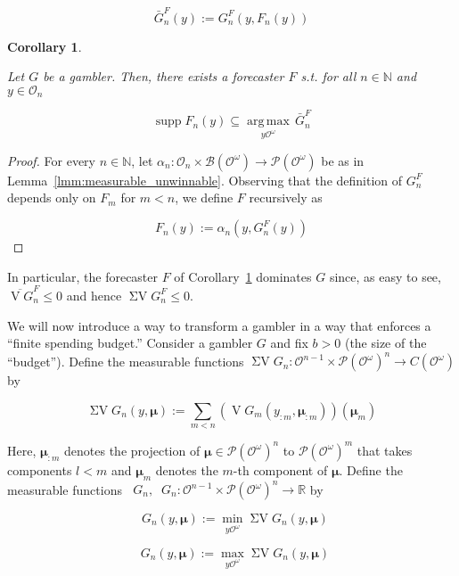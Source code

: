 \documentclass[11pt]{article}
\theoremstyle{definition}
\theoremstyle{plain}
\newtheorem{corollary}{Corollary}%
\newcommand{\Nats}{\mathbb{N}}
\newcommand{\Reals}{\mathbb{R}}
\newcommand{\Argmax}[1]{\underset{#1}{\operatorname{arg\,max}}\,}
\newcommand{\PM}{\mathcal{P}}
\DeclareMathOperator{\Sp}{supp}
\newcommand{\Ob}{\mathcal{O}}
\newcommand{\OO}{\Ob^\omega}
\newcommand{\PMO}{\PM(\OO)}
\newcommand{\Gm}{\mathcal{B}}
\newcommand{\GMO}{\Gm(\OO)}
\newcommand{\CO}{C(\OO)}
\DeclareMathOperator{\V}{V}
\DeclareMathOperator{\SV}{\Sigma V}
\DeclareMathOperator{\SVM}{\Sigma V_{\min}}
\DeclareMathOperator{\SVX}{\Sigma V_{\max}}
\newcommand{\BM}{\bm{\mu}}
\begin{document}
\begin{equation}
\bar{G}^F_n(y) := G^F_n(y,F_n(y))
\end{equation}

\begin{corollary}
\label{crl:dominate_one}

Let $G$ be a gambler. Then, there exists a forecaster $F$ s.t. for all $n \in \Nats$ and $y \in \Ob_n$

\begin{equation}
\Sp F_n(y) \subseteq \Argmax{y\OO} \bar{G}^F_n
\end{equation}

\end{corollary}

\begin{proof}

For every $n \in \Nats$, let $\alpha_n: \Ob_n \times \GMO \rightarrow \PMO$ be as in Lemma~\ref{lmm:measurable_unwinnable}. Observing that the definition of $G^F_n$ depends only on $F_m$ for $m < n$, we define $F$ recursively as

\[F_n(y):=\alpha_n(y,G^F_n(y))\]
\end{proof}

In particular, the forecaster $F$ of Corollary~\ref{crl:dominate_one} dominates $G$ since, as easy to see, $\overline{\V G}^F_n \leq 0$ and hence $\SV G^F_n \leq 0$.

We will now introduce a way to transform a gambler in a way that enforces a \enquote{finite spending budget.} Consider a gambler $G$ and fix $b > 0$ (the size of the \enquote{budget}). Define the measurable functions $\SV G_n: \Ob^{n-1} \times \PMO^n  \rightarrow \CO$ by

\begin{equation}
\SV G_n(y,\BM) := \sum_{m < n} (\V G_m(y_{:m},\BM_{:m}))(\BM_m)
\end{equation}

Here, $\BM_{:m}$ denotes the projection of $\BM \in \PMO^n$ to $\PMO^m$ that takes components $l < m$ and $\BM_m$ denotes the $m$-th component of $\BM$. Define the measurable functions $\SVM G_n, \SVX G_n: \Ob^{n-1} \times \PMO^n  \rightarrow \Reals$ by

\begin{equation}
\SVM G_n(y,\BM) := \min_{y\OO}{\SV G_n(y,\BM)}
\end{equation}

\begin{equation}
\SVX G_n(y,\BM) := \max_{y\OO}{\SV G_n(y,\BM)}
\end{equation}
\end{document}
